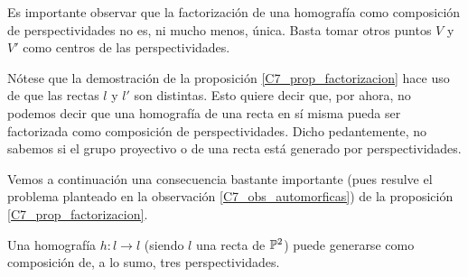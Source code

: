 \begin{obs}
	Es importante observar que la factorización de una homografía como composición de perspectividades no es, ni mucho menos, única. Basta tomar otros puntos $V$ y $V'$ como centros de las perspectividades.
\end{obs}
\begin{obs}
	\label{C7_obs_automorficas}
	Nótese que la demostración de la proposición \ref{C7_prop_factorizacion} hace uso de que las rectas $l$ y $l'$ son distintas. Esto quiere decir que, por ahora, no podemos decir que una homografía de una recta en sí misma pueda ser factorizada como composición de perspectividades. Dicho pedantemente, no sabemos si el grupo proyectivo o  de una recta está generado por perspectividades.
\end{obs}
Vemos a continuación una consecuencia bastante importante (pues resulve el problema planteado en la observación \ref{C7_obs_automorficas}) de la proposición \ref{C7_prop_factorizacion}.
\begin{cor}
	Una homografía $h:l\to l$ (siendo $l$ una recta de $\mathbb{P}^2$) puede generarse como composición de, a lo sumo, tres perspectividades.
\end{cor}
